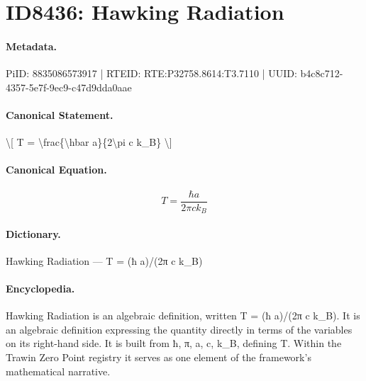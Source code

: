 \section*{ID8436: Hawking Radiation}
\paragraph{Metadata.}
PiID: 8835086573917 | RTEID: RTE:P32758.8614:T3.7110 | UUID: b4c8c712-4357-5e7f-9ec9-c47d9dda0aae

\paragraph{Canonical Statement.}
\textbackslash{}[ T = \textbackslash{}frac\{\textbackslash{}hbar a\}\{2\textbackslash{}pi c k\_B\} \textbackslash{}]

\paragraph{Canonical Equation.}
\[
T = \frac{\hbar a}{2\pi c k_B}
\]

\paragraph{Dictionary.}
Hawking Radiation — T = (ħ a)/(2π c k\_B)

\paragraph{Encyclopedia.}
Hawking Radiation is an algebraic definition, written T = (ħ a)/(2π c k\_B). It is an algebraic definition expressing the quantity directly in terms of the variables on its right-hand side. It is built from ħ, π, a, c, k\_B, defining T. Within the Trawin Zero Point registry it serves as one element of the framework's mathematical narrative.

